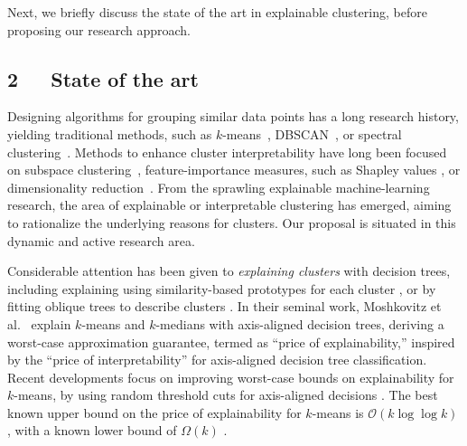 \documentclass[a4paper,11pt]{article}
\begin{document}
\vspace{-2mm}
\noindent
Next, we briefly discuss the state of the art in explainable clustering, before proposing our research approach.

\subsection*{2~~~State of the art}


Designing algorithms for grouping similar data points has a long research history,
yielding traditional methods, 
such as $k$-means~\cite{macqueen1967some}, 
DBSCAN~\cite{ester1996ada}, or spectral clustering~\cite{ng2001spectral}.
Methods to enhance cluster interpretability have long been focused on subspace clustering~\cite{rubinstein2010dict}, 
feature-importance measures, such as Shapley values \cite{lundberg2017unified}, 
or dimensionality reduction~\cite{hinton2002tsne,mcinnes2018umap}.
From the sprawling explainable machine-learning research, the area of explainable or interpretable clustering has emerged, aiming to rationalize the underlying reasons for clusters. 
Our proposal is situated in this dynamic and active research area. 

Considerable attention has been given to \emph{explaining clusters} with decision trees,
including explaining using similarity-based prototypes for each cluster \cite{carrizosa2022interpreting}, 
or by fitting oblique trees to describe clusters \cite{gabidolla2022optimal}.
In their seminal work, Moshkovitz et al.~\cite{moshkovitz2020explainable} 
explain $k$-means and $k$-medians with axis-aligned decision trees, 
deriving a worst-case approximation guarantee, termed as ``price of explainability,'' 
inspired by the ``price of interpretability'' \cite{bertsimas2019price} for axis-aligned decision tree classification. 
Recent developments focus on improving worst-case bounds on explainability for $k$-means, 
by using random threshold cuts for axis-aligned decisions 
\cite{esfandiari2022almost, makarychev2022explainable}. 
The best known upper bound on the price of explainability for $k$-means is 
$\mathcal{O}(k \log \log k)$ \cite{gupta2023price}, 
with a known lower bound of $\Omega(k)$ \cite{gamlath2021explainable}.
\end{document}
